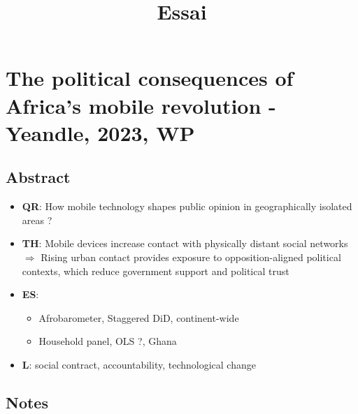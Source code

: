 \documentclass[11pt]{article}
\title{Essai}
\begin{document}
\maketitle


\tableofcontents
\clearpage

\section{The political consequences of Africa’s mobile revolution - Yeandle, 2023, WP}

\subsection{Abstract}
\begin{itemize}
    \item \textbf{QR}: How mobile technology shapes public opinion in geographically isolated areas ?
    \item \textbf{TH}: Mobile devices increase contact with physically distant social networks
    \\
    $\Rightarrow$ Rising urban contact provides exposure to opposition-aligned political contexts, which reduce government support and political trust
    \item \textbf{ES}: \begin{itemize}
        \item Afrobarometer, Staggered DiD, continent-wide
        \item Household panel, OLS ?, Ghana
    \end{itemize}
    \item \textbf{L}: social contract, accountability, technological change
\end{itemize}

\subsection{Notes}
\end{document}
